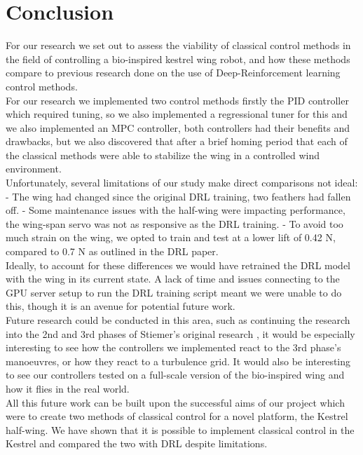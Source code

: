 \section{Conclusion}
For our research we set out to assess the viability of classical control methods in the field of controlling a bio-inspired kestrel wing robot, and how these methods compare to previous research done on the use of Deep-Reinforcement learning control methods.
\\
For our research we implemented two control methods firstly the PID controller which required tuning, so we also implemented a regressional tuner for this and we also implemented an MPC controller, both controllers had their benefits and drawbacks, but we also discovered that after a brief homing period that each of the classical methods were able to stabilize the wing in a controlled wind environment.
\\
Unfortunately, several limitations of our study make direct comparisons not ideal:
-	The wing had changed since the original DRL training, two feathers had fallen off.
-	Some maintenance issues with the half-wing were impacting performance, the wing-span servo was not as responsive as the DRL training.
-	To avoid too much strain on the wing, we opted to train and test at a lower lift of 0.42 N, compared to 0.7 N as outlined in the DRL paper.
\\
Ideally, to account for these differences we would have retrained the DRL model with the wing in its current state. A lack of time and issues connecting to the GPU server setup to run the DRL training script meant we were unable to do this, though it is an avenue for potential future work. 
\\
Future research could be conducted in this area, such as continuing the research into the 2nd and 3rd phases of Stiemer's original research \cite{5}, it would be especially interesting to see how the controllers we implemented react to the 3rd phase's manoeuvres, or how they react to a turbulence grid. It would also be interesting to see our controllers tested on a full-scale version of the bio-inspired wing and how it flies in the real world.
\\
All this future work can be built upon the successful aims of our project which were to create two methods of classical control for a novel platform, the Kestrel half-wing. We have shown that it is possible to implement classical control in the Kestrel and compared the two with DRL despite limitations.
